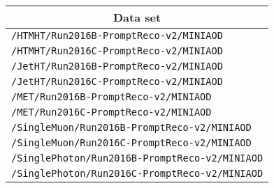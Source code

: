 \begin{center}
\begin{tabular}{l}
\hline\hline
\multicolumn{1}{c}{Data set}\tabularnewline
\hline
\verb!/HTMHT/Run2016B-PromptReco-v2/MINIAOD!\tabularnewline
\verb!/HTMHT/Run2016C-PromptReco-v2/MINIAOD!\tabularnewline
\verb!/JetHT/Run2016B-PromptReco-v2/MINIAOD!\tabularnewline
\verb!/JetHT/Run2016C-PromptReco-v2/MINIAOD!\tabularnewline
\verb!/MET/Run2016B-PromptReco-v2/MINIAOD!\tabularnewline
\verb!/MET/Run2016C-PromptReco-v2/MINIAOD!\tabularnewline
\verb!/SingleMuon/Run2016B-PromptReco-v2/MINIAOD!\tabularnewline
\verb!/SingleMuon/Run2016C-PromptReco-v2/MINIAOD!\tabularnewline
\verb!/SinglePhoton/Run2016B-PromptReco-v2/MINIAOD!\tabularnewline
\verb!/SinglePhoton/Run2016C-PromptReco-v2/MINIAOD!\tabularnewline
\hline
\end{tabular}\end{center}
